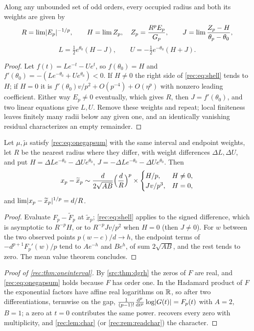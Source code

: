 \begin{theorem}\label{rec:thm:onegapinverse}
Along any unbounded set of odd orders, every occupied radius and both its weights are given by
\[
 R=\lim\lvert E_p\rvert^{-1/p},\qquad H=\lim Z_p,\quad Z_p=\frac{R^pE_p}{G_p},\qquad
 J=\lim\frac{Z_p-H}{\theta_p-\theta_0},
\]
\[
 L=\tfrac12e^{\theta_0}(H-J),\qquad U=-\tfrac12e^{-\theta_0}(H+J).
\]
\end{theorem}

\begin{proof}
Let $f(t)=Le^{-t}-Ue^t$, so $f(\theta_0)=H$ and $f'(\theta_0)=-(Le^{-\theta_0}+Ue^{\theta_0})<0$. If
$H\ne0$ the right side of \eqref{rec:eq:shell} tends to $H$; if $H=0$ it is
$f'(\theta_0)v/p^2+O(p^{-4})+O(\eta^p)$ with nonzero leading coefficient. Either way $E_p\ne0$
eventually, which gives $R$, then $J=f'(\theta_0)$, and two linear equations give $L,U$. Remove
these weights and repeat; local finiteness leaves finitely many radii below any given one, and
an identically vanishing residual characterizes an empty remainder.
\end{proof}

\begin{theorem}\label{rec:thm:onegaprate}
Let $\mu,\widetilde\mu$ satisfy \eqref{rec:eq:onegapsum} with the same interval and endpoint
weights, let $R$ be the nearest radius where they differ, with weight differences
$\Delta L,\Delta U$, and put $H=\Delta Le^{-\theta_0}-\Delta Ue^{\theta_0}$,
$J=-\Delta Le^{-\theta_0}-\Delta Ue^{\theta_0}$. Then
\[
 x_p-\widetilde x_p\sim\frac d{2\sqrt{AB}}\Bigl(\frac dR\Bigr)^p\times
 \begin{cases}H/p,&H\ne0,\\ Jv/p^3,&H=0,\end{cases}
\]
and $\lim\lvert x_p-\widetilde x_p\rvert^{1/p}=d/R$.
\end{theorem}

\begin{proof}
Evaluate $F_p-\widetilde F_p$ at $\widetilde x_p$; \eqref{rec:eq:shell} applies to the signed
difference, which is asymptotic to $R^{-p}H$, or to $R^{-p}Jv/p^2$ when $H=0$ (then $J\ne0$). For
$w$ between the two observed points $p(w-c)/d\to h$, the endpoint terms of $-d^{p+1}F_p'(w)/p$ tend
to $Ae^{-h}$ and $Be^h$, of sum $2\sqrt{AB}$, and the rest tends to zero. The mean value theorem
concludes.
\end{proof}

\begin{proof}[Proof of \cref{rec:thm:oneinterval}]
By \cref{src:thm:dgrh} the zeros of $F$ are real, and \eqref{rec:eq:onegapsum} holds because $F$ has
order one. In the Hadamard product of $F$ the exponential factors have affine real logarithms on
$\mathbb{R}$, so after two differentiations, termwise on the gap,
$\frac1{(p-1)!}\frac{\mathrm{d}^p}{\mathrm{d} t^p}\log\lvert G(t)\rvert=F_p(t)$ with $A=2$, $B=1$; a zero at $t=0$
contributes the same power.  recovers every zero with multiplicity,
and \cref{rec:lem:char} (or \cref{rec:rem:readchar}) the character.
\end{proof}

